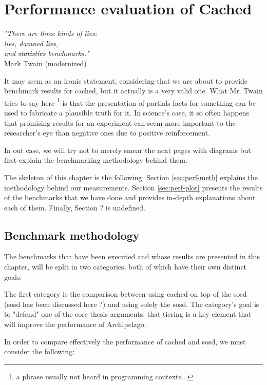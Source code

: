 \chapter{Performance evaluation of Cached}\label{ch:cached-evaluation}

\begin{flushright}
	\textit{"There are three kinds of lies:\\
		lies, damned lies, \\
		and \sout{statistics} benchmarks."}	\\

	Mark Twain (modernized)
\end{flushright}

It may seem as an ironic statement, considering that we are about to provide 
benchmark results for cached, but it actually is a very valid one. What Mr.  
Twain tries to say here
\footnote{
	a phrase usually not heard in programming contexts...
}
is that the presentation of partials facts for something can be used to 
fabricate a plausible truth for it. In science's case, it so often happens that 
promising results for an experiment can seem more important to the researcher's 
eye than negative ones due to positive reinforcement.

In out case, we will try not to merely smear the next pages with diagrams but 
first explain the benchmarking methodology behind them.

The skeleton of this chapter is the following: Section \ref{sec:perf-meth} 
explains the methodology behind our measurements. Section \ref{sec:perf-plot} 
presents the results of the benchmarks that we have done and provides in-depth 
explanations about each of them. Finally, Section ? is undefined.

\section{Benchmark methodology}

The benchmarks that have been executed and whose results are presented in this 
chapter, will be split in two categories, both of which have their own distinct 
goals:

The first category is the comparison between using cached on top of the sosd 
(sosd has been discussed here ?) and using solely the sosd. The category's goal 
is to "defend" one of the core thesis arguments, that tiering is a key element 
that will improve the performance of Archipelago. 

In order to compare effectively the performance of cached and sosd, we must 
consider the following: 

